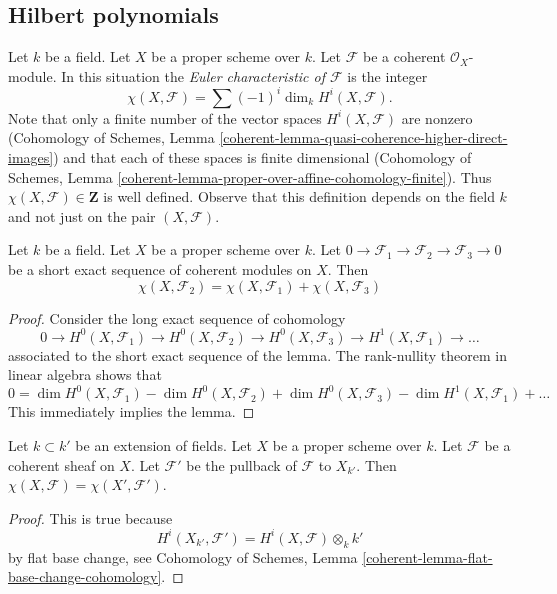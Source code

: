\subsection{Hilbert polynomials}
\label{subsection-hilbert}

\noindent
Let $k$ be a field. Let $X$ be a proper scheme over $k$. Let $\mathcal{F}$
be a coherent $\mathcal{O}_X$-module. In this situation the
{\it Euler characteristic of $\mathcal{F}$} is the integer
$$
\chi(X, \mathcal{F}) = \sum (-1)^i \dim_k H^i(X, \mathcal{F}).
$$
Note that only a finite number of the vector spaces $H^i(X, \mathcal{F})$
are nonzero (Cohomology of Schemes, Lemma
\ref{coherent-lemma-quasi-coherence-higher-direct-images})
and that each of these spaces is finite dimensional
(Cohomology of Schemes, Lemma
\ref{coherent-lemma-proper-over-affine-cohomology-finite}). Thus
$\chi(X, \mathcal{F}) \in \mathbf{Z}$ is well defined. Observe that
this definition depends on the field $k$ and not just on the pair
$(X, \mathcal{F})$.

\begin{lemma}
\label{lemma-euler-characteristic-additive}
Let $k$ be a field. Let $X$ be a proper scheme over $k$.
Let $0 \to \mathcal{F}_1 \to \mathcal{F}_2 \to \mathcal{F}_3 \to 0$
be a short exact sequence of coherent modules on $X$. Then
$$
\chi(X, \mathcal{F}_2) = \chi(X, \mathcal{F}_1) + \chi(X, \mathcal{F}_3)
$$
\end{lemma}

\begin{proof}
Consider the long exact sequence of cohomology
$$
0 \to H^0(X, \mathcal{F}_1) \to H^0(X, \mathcal{F}_2) \to
H^0(X, \mathcal{F}_3) \to H^1(X, \mathcal{F}_1) \to \ldots
$$
associated to the short exact sequence of the lemma. The rank-nullity theorem
in linear algebra shows that
$$
0 = \dim H^0(X, \mathcal{F}_1) - \dim H^0(X, \mathcal{F}_2)
+ \dim H^0(X, \mathcal{F}_3) - \dim H^1(X, \mathcal{F}_1) + \ldots
$$
This immediately implies the lemma.
\end{proof}

\begin{lemma}
\label{lemma-euler-characteristic-extend-base-field}
Let $k \subset k'$ be an extension of fields. Let $X$ be a proper scheme
over $k$. Let $\mathcal{F}$ be a coherent sheaf on $X$.
Let $\mathcal{F}'$ be the pullback of $\mathcal{F}$ to $X_{k'}$.
Then $\chi(X, \mathcal{F}) = \chi(X', \mathcal{F}')$.
\end{lemma}

\begin{proof}
This is true because
$$
H^i(X_{k'}, \mathcal{F}') = H^i(X, \mathcal{F}) \otimes_k k'
$$
by flat base change, see
Cohomology of Schemes, Lemma \ref{coherent-lemma-flat-base-change-cohomology}.
\end{proof}

